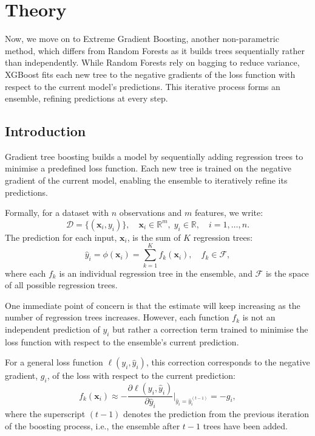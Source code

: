 \documentclass[11pt]{report} %
\begin{document}
\section{Theory}
Now, we move on to Extreme Gradient Boosting, another non-parametric method, which differs from Random Forests as it builds trees sequentially rather than independently. While Random Forests rely on bagging to reduce variance, XGBoost fits each new tree to the negative gradients of the loss function with respect to the current model's predictions. This iterative process forms an ensemble, refining predictions at every step.

\subsection{Introduction}
Gradient tree boosting builds a model by sequentially adding regression trees to minimise a predefined loss function. Each new tree is trained on the negative gradient of the current model, enabling the ensemble to iteratively refine its predictions.\cite{chen2016xgboost}

Formally, for a dataset with \( n \) observations and \( m \) features,
we write:
\[
\mathcal{D} = \{(\mathbf{x}_i, y_i)\}, \quad \mathbf{x}_i \in \mathbb{R}^m, \; y_i \in \mathbb{R}, \quad i = 1, \dots, n.
\]
The prediction for each input, \( \mathbf{x}_i \), is the sum of \( K \) regression trees:
\begin{equation}
\hat{y}_i = \phi(\mathbf{x}_i) = \sum_{k=1}^K f_k(\mathbf{x}_i), \quad f_k \in \mathcal{F},
\label{XGBoost Prediction}
\end{equation}
where each $f_k$ is an individual regression tree in the ensemble, and \( \mathcal{F} \) is the space of all possible regression trees.\cite{chen2016xgboost}

One immediate point of concern is that the estimate will keep increasing as the number of regression trees increases. However, each function \( f_k \) is not an independent prediction of \( y_i \) but rather a correction term trained to minimise the loss function with respect to the ensemble’s current prediction. 

For a general loss function \( \ell(y_i, \hat{y}_i) \), this correction corresponds to the negative gradient, $g_i$, of the loss with respect to the current prediction:
\[
f_k(\mathbf{x}_i) \approx -\frac{\partial \ell(y_i, \hat{y}_i)}{\partial \hat{y}_i}\Big|_{\hat{y}_i = \hat{y}_i^{(t-1)}}=-g_i,
\]
where the superscript \( (t - 1) \) denotes the prediction from the previous iteration of the boosting process, i.e., the ensemble after \( t - 1 \) trees have been added.
\end{document}
